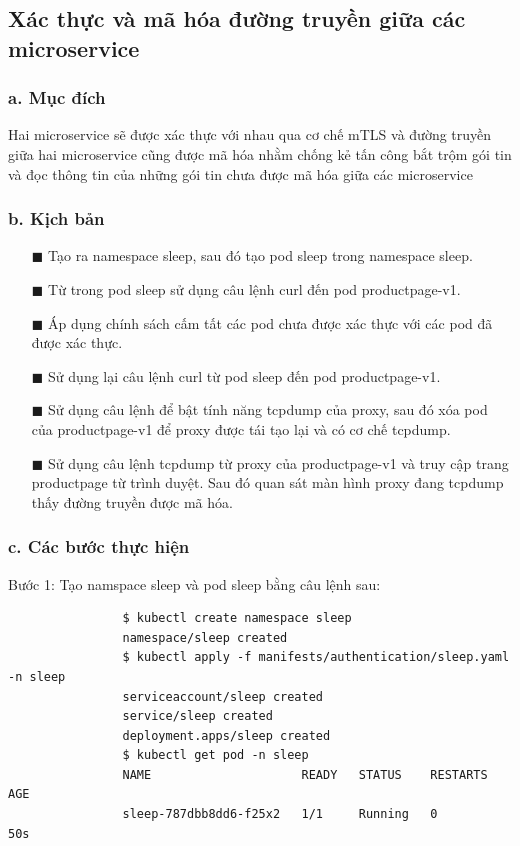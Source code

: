 \documentclass[14pt,a4paper]{book}
\begin{document}
{{		\subsection{Xác thực và mã hóa đường truyền giữa các microservice}
			\subsubsection{a. Mục đích}
				{\hspace{0.6cm}Hai microservice sẽ được xác thực với nhau qua cơ chế mTLS và đường truyền giữa hai microservice cũng được mã hóa nhằm chống kẻ tấn công bắt trộm gói tin và đọc thông tin của những gói tin chưa được mã hóa giữa các microservice}
			\subsubsection{b. Kịch bản}
				\begin{enumerate}
					\item[$\blacksquare$] Tạo ra namespace sleep, sau đó tạo pod sleep trong namespace sleep.
					\item[$\blacksquare$] Từ trong pod sleep sử dụng câu lệnh curl đến pod productpage-v1.
					\item[$\blacksquare$] Áp dụng chính sách cấm tất các pod chưa được xác thực với các pod đã được xác thực.
					\item[$\blacksquare$] Sử dụng lại câu lệnh curl từ pod sleep đến pod productpage-v1.
					\item[$\blacksquare$] Sử dụng câu lệnh để bật tính năng tcpdump của proxy, sau đó xóa pod của productpage-v1 để proxy được tái tạo lại và có cơ chế tcpdump.
					\item[$\blacksquare$] Sử dụng câu lệnh tcpdump từ proxy của productpage-v1 và truy cập trang productpage từ trình duyệt. Sau đó quan sát màn hình proxy đang tcpdump thấy đường truyền được mã hóa. 
				\end{enumerate}
			\subsubsection{c. Các bước thực hiện}
				{\hspace{0.6cm}Bước 1: Tạo namspace sleep và pod sleep bằng câu lệnh sau:}
				\begin{lstlisting}
				$ kubectl create namespace sleep
				namespace/sleep created
				$ kubectl apply -f manifests/authentication/sleep.yaml -n sleep
				serviceaccount/sleep created
				service/sleep created
				deployment.apps/sleep created
				$ kubectl get pod -n sleep
				NAME                     READY   STATUS    RESTARTS   AGE
				sleep-787dbb8dd6-f25x2   1/1     Running   0          50s
				\end{lstlisting}
				
}}
\end{document}

